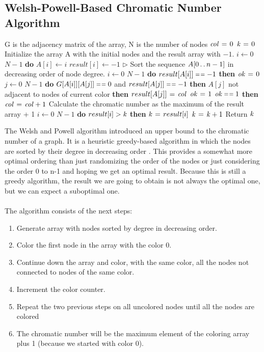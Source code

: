 \documentclass[12pt]{article}
\begin{document}
\subsection{Welsh-Powell-Based Chromatic Number Algorithm}
\begin{codebox}
\li \Comment G is the adjacency matrix of the array, N is the number of nodes
\li $\id{col} \gets 0$
\li $\id{k} \gets 0$
\li \Comment Initialize the array A with the initial nodes and the result array with $-1$.
\li \For $i \gets 0$ \To $N-1$ {\bf do}
\li \Do $A[i] \gets i$
\li $result[i] \gets -1$ \End
\li $\rhd$ Sort the sequence $A[0 \mathinner{\ldotp\ldotp} n-1]$ in decreasing order of node degree.
\li \For $i \gets 0$ \To $N-1$ {\bf do}
\li \Do \If $result[A[i]] \isequal -1$ {\bf then}
\li \Do $\id{ok} \gets 0$
\li \For $j \gets 0$ \To $N-1$ {\bf do}
\li \Do \If $G[A[i]][A[j]] \isequal 0$ and $result[A[j]] \isequal -1$ {\bf then}
\li \Do \If $A[j]$ not adjacent to nodes of current color {\bf then}
\li \Do $result[A[j]] \gets \id{col}$
\li $\id{ok} \gets 1$ \End \End \End
\li \If $\id{ok} \isequal 1$ {\bf then}
\li \Do $\id{col} \gets \id{col}+1$ \End \End \End
\li \Comment Calculate the chromatic number as the maximum of the result array + 1
\li \For $i \gets 0$ \To $N-1$ {\bf do}
\li \Do \If $result[i] > \id{k}$ {\bf then}
\li \Do $\id{k} \gets result[i]$ \End \End
\li $\id{k} \gets \id{k} + 1$
\li Return $\id{k}$
\End 
\end{codebox}
\quad
The Welsh and Powell algorithm introduced an upper bound to the chromatic number of a graph. It is a heuristic greedy-based algorithm in which the nodes are sorted by their degree in decreasing order \cite{welsh-powell}. This provides a somewhat more optimal ordering than just randomizing the order of the nodes or just considering the order 0 to n-1 and hoping we get an optimal result. Because this is still a greedy algorithm, the result we are going to obtain is not always the optimal one, but we can expect a suboptimal one. \\ \quad \\
The algorithm consists of the next steps:
\begin{enumerate}
\item Generate array with nodes sorted by degree in decreasing order.
\item Color the first node in the array with the color 0.
\item Continue down the array and color, with the same color, all the nodes not connected to nodes of the same color.
\item Increment the color counter.
\item Repeat the two previous steps on all uncolored nodes until all the nodes are colored
\item The chromatic number will be the maximum element of the coloring array plus 1 (because we started with color 0).
\end{enumerate} \quad \\
\end{document}

